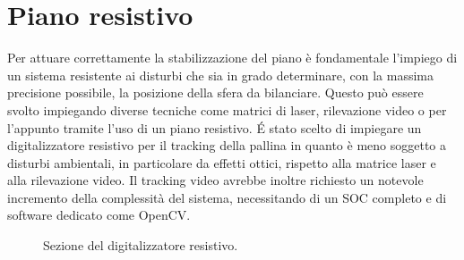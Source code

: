 \documentclass[12pt,twoside,openright]{report}
\begin{document}
\section{Piano resistivo}\label{pianoresistivo}
Per attuare correttamente la stabilizzazione del piano è fondamentale l'impiego di un sistema resistente ai disturbi che sia in grado determinare, con la massima precisione possibile, la posizione della sfera da bilanciare. Questo può essere svolto impiegando diverse tecniche come matrici di laser, rilevazione video o per l'appunto tramite l'uso di un piano resistivo.
É stato scelto di impiegare un digitalizzatore resistivo per il tracking della pallina in quanto è meno soggetto a disturbi ambientali, in particolare da effetti ottici, rispetto alla matrice laser e alla rilevazione video.
Il tracking video avrebbe inoltre richiesto un notevole incremento della complessità del sistema, necessitando di un SOC completo e di software dedicato come OpenCV.
\begin{figure}[h!]
\centering
{}
\caption{Sezione del digitalizzatore resistivo.} \label{fig:sezione}
\end{figure}
\end{document}
